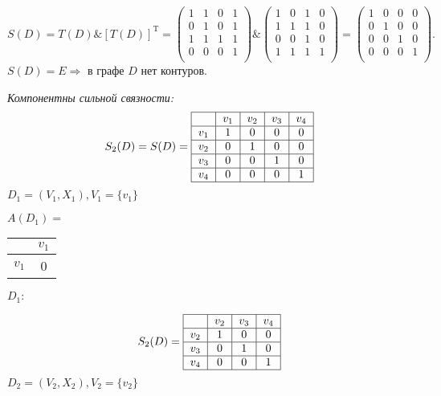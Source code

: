 \documentclass[12pt, letterpaper, titlepage]{article}
\begin{document}
\begin{equation}
S(D) = T(D) \& [T(D)]^\mathrm{T} =     
\begin{pmatrix}
    1 & 1 & 0 & 1\\
    0 & 1 & 0 & 1\\
    1 & 1 & 1 & 1\\
    0 & 0 & 0 & 1\\
\end{pmatrix}
\&
\begin{pmatrix}
    1 & 0 & 1 & 0\\
    1 & 1 & 1 & 0\\
    0 & 0 & 1 & 0\\
    1 & 1 & 1 & 1\\
\end{pmatrix}
=
\begin{pmatrix}
    1 & 0 & 0 & 0\\
    0 & 1 & 0 & 0\\
    0 & 0 & 1 & 0\\
    0 & 0 & 0 & 1\\
\end{pmatrix}.
\end{equation}
$S(D)=E\Rightarrow$ в графе $D$ нет контуров.

\emph{Компонентны сильной связности:}
\begin{equation}
S_2(D) = S(D) = 
\begin{tabular}{ | c | c | c | c | c | c | } 
    \hline
    & $v_{1}$ & $v_{2}$ & $v_{3}$ & $v_{4}$\\ 
    \hline
    $v_{1}$ & 1 & 0 & 0 & 0\\ 
    \hline
    $v_{2}$ & 0 & 1 & 0 & 0\\ 
    \hline
    $v_{3}$ & 0 & 0 & 1 & 0\\
    \hline
    $v_{4}$ & 0 & 0 & 0 & 1\\
    \hline
\end{tabular}
\end{equation}
$D_1=(V_1,X_1), V_1=\{v_1\}$

$A(D_1)=$
\begin{tabular}{|c|c|}
    \hline
    & $v_{1}$ \\ 
    \hline
    $v_{1}$ & 0 \\ 
    \hline
\end{tabular}\hspace{1cm}$D_1:$\hspace{1cm}


\begin{equation}
    S_2(D) = 
    \begin{tabular}{ | c | c | c | c |  } 
        \hline
        & $v_{2}$ & $v_{3}$ & $v_{4}$ \\ 
        \hline
        $v_{2}$ & 1 & 0 & 0\\ 
        \hline
        $v_{3}$ & 0 & 1 & 0\\
        \hline
        $v_{4}$ & 0 & 0 & 1\\
        \hline
    \end{tabular}
\end{equation}
$D_2=(V_2,X_2), V_2=\{v_2\}$
\end{document}
